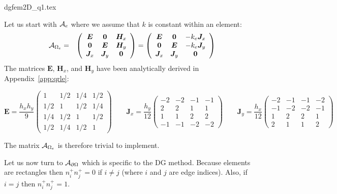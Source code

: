 \begin{flushright} {\tiny {\color{gray} dgfem2D\_q1.tex}} \end{flushright}


Let us start with ${\cal A}_e$ where we assume that $k$ is constant within an element:
\begin{eqnarray}
{\cal A}_{\Omega_e}&=&
\left(
\begin{array}{ccc}
{\bm E} & {\bm 0} & {\bm H}_x \\
{\bm 0} & {\bm E} & {\bm H}_y \\
{\bm J}_x & {\bm J}_y & {\bm 0}
\end{array}
\right)
=
\left(
\begin{array}{ccc}
{\bm E} & {\bm 0} & -k_e{\bm J}_x \\
{\bm 0} & {\bm E} & -k_e{\bm J}_y \\
{\bm J}_x & {\bm J}_y & {\bm 0}
\end{array}
\right)
\end{eqnarray}
The matrices ${\bm E}$, ${\bm H}_x$, and ${\bm H}_y$ 
have been analytically derived in Appendix~\ref{app:qrle}:
\begin{scriptsize}
\[
{\bm E}=
\frac{h_x h_y}{9}
\left(
\begin{array}{cccc}
1 & 1/2 & 1/4 & 1/2 \\ 
1/2 & 1   & 1/2 & 1/4 \\ 
1/4 & 1/2 & 1 & 1/2 \\ 
1/2 & 1/4 & 1/2 & 1  
\end{array}
\right)
\qquad
{\bm J}_x=
\frac{h_y}{12} 
\left(
\begin{array}{cccc}
-2 & -2 & -1 & -1 \\
 2 &  2 &  1 & 1 \\
  1 &   1 & 2 & 2 \\
- 1 &  - 1 & -2 & -2
\end{array}
\right)
\qquad
{\bm J}_y=
\frac{h_x}{12} 
\left(
\begin{array}{cccc}
-2 & -1 & -1 & -2 \\
-1 & -2 & -2 & -1  \\
 1 &  2 &  2 &  1  \\
2 & 1 & 1 & 2 
\end{array}
\right) 
\]
\end{scriptsize}
The matrix ${\cal A}_{\Omega_e}$ is therefore trivial to implement. 

Let us now turn to $ {\cal A}_{\partial\Omega}$ which is specific to the DG method.
Because elements are rectangles then $n_i^+n_j^+=0$ if $i \neq j$ (where $i$ and $j$ 
are edge indices). 
Also, if $i=j$ then $n_i^+n_j^+=1$. 

